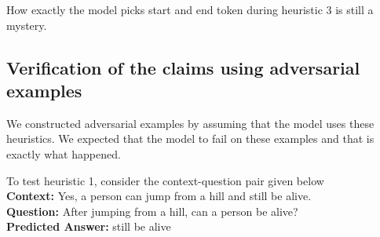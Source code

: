 \documentclass[10pt,twocolumn,letterpaper]{article}
\begin{document}
How exactly the model picks start and end token during heuristic 3 is still a mystery.
\subsection{Verification of the claims using adversarial examples}
We constructed adversarial examples by assuming that the model uses these heuristics. We expected that the model to fail on these examples and that is exactly what happened.

To test heuristic 1, consider the context-question pair given below\\
\textbf{Context: }Yes, a person can jump from a hill and still be alive.\\
\textbf{Question: }After jumping from a hill, can a person be alive?\\
\textbf{Predicted Answer: }still be alive 
\onecolumn
\end{document}
